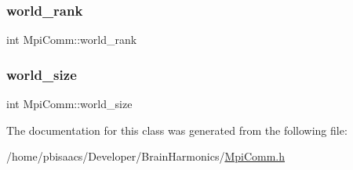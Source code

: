 \subsubsection{\texorpdfstring{world\+\_\+rank}{world\_rank}}
{\footnotesize\ttfamily int Mpi\+Comm\+::world\+\_\+rank\hspace{0.3cm}{\ttfamily [private]}}

\mbox{\label{classMpiComm_a2e1fb05065d45c4af5cf2c3a56a7687f}} 
\subsubsection{\texorpdfstring{world\+\_\+size}{world\_size}}
{\footnotesize\ttfamily int Mpi\+Comm\+::world\+\_\+size\hspace{0.3cm}{\ttfamily [private]}}



The documentation for this class was generated from the following file\+:\begin{DoxyCompactItemize}
\item 
/home/pbisaacs/\+Developer/\+Brain\+Harmonics/\mbox{\hyperlink{MpiComm_8h}{Mpi\+Comm.\+h}}\end{DoxyCompactItemize}
